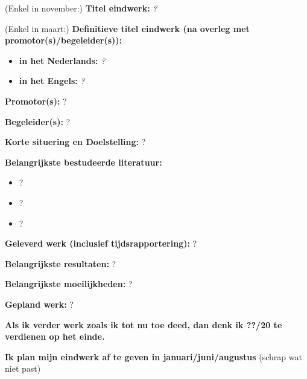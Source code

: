 \documentclass[12pt]{report}
\begin{document}
\pagestyle{myheadings}
(Enkel in november:) {\bf Titel eindwerk:} {\em ?}

\vspace{0.5cm}
(Enkel in maart:) {\bf Definitieve titel eindwerk (na overleg met promotor(s)/begeleider(s)):}
\begin{itemize}
\item {\bf in het Nederlands:} {\em ?}
\item {\bf in het Engels:} {\em ?}
\end{itemize}


\vspace{0.5cm}
{\bf Promotor(s):} ?


\vspace{0.5cm}
{\bf Begeleider(s):} ?

\vspace{1cm}
{\bf Korte situering en Doelstelling: }
?

\vspace{1cm}
{\bf Belangrijkste bestudeerde literatuur:}
\begin{itemize}
\item ?
\item ?
\item ?
\end{itemize}

\vspace{1cm}
{\bf Geleverd werk (inclusief tijdsrapportering):}
?

\vspace{1cm}
{\bf Belangrijkste resultaten:}
?


\vspace{1cm}
{\bf Belangrijkste moeilijkheden:}
?

\vspace{1cm}
{\bf Gepland werk:}
?


\vspace{1cm}
{\bf Als ik verder werk zoals ik tot nu toe deed, dan denk ik ??/20 te
    verdienen op het einde.}

{\bf Ik plan mijn eindwerk af te geven in januari/juni/augustus} (schrap wat niet past)
\end{document}
